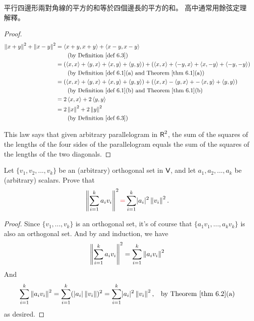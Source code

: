 \begin{note}
平行四邊形兩對角線的平方的和等於四個邊長的平方的和。
高中通常用餘弦定理解釋。
\end{note}

\begin{proof}
\begin{align*}
    \norm{x + y}^2 + \norm{x - y}^2
    & = \LG x + y, x + y \RG + \LG x - y, x - y \RG \\
    & \quad \quad \text{(by \DEF{6.3})} \\
    & = (\LG x, x \RG + \LG y, x \RG + \LG x, y \RG + \LG y, y \RG) + (\LG x, x \RG + \LG -y, x \RG + \LG x, -y \RG + \LG -y, -y \RG) \\
    & \quad \quad \text{(by \DEF{6.1}(a) and \THM{6.1}(a))} \\
    & = (\LG x, x \RG + \LG y, x \RG + \LG x, y \RG + \LG y, y \RG) + (\LG x, x \RG - \LG y, x \RG + -\LG x, y \RG + \LG y, y \RG) \\
    & \quad \quad \text{(by \DEF{6.1}(b) and \THM{6.1}(b)} \\
    & = 2 \LG x, x \RG + 2 \LG y, y \RG \\
    & = 2 \norm{x}^2 + 2 \norm{y}^2 \\
    & \quad \quad \text{(by \DEF{6.3})}
\end{align*}

This law says that given arbitrary parallelogram in \(\textsf{R}^2\), the sum of the squares of the lengths of the four sides of the parallelogram equals the sum of the squares of the lengths of the two diagonals.
\end{proof}

\begin{exercise} \label{exercise 6.1.12}
Let \(\{ v_1, v_2, ..., v_k \}\) be an (arbitrary) orthogonal set in \(\textsf{V}\), and let \(a_1, a_2, ..., a_k\) be (arbitrary) scalars.
Prove that
\[
    \norm{\sum_{i = 1}^k a_i v_i}^2 \RED{=} \sum_{i = 1}^k \abs{a_i}^2 \norm{v_i}^2.
\]
\end{exercise}

\begin{proof}
Since \(\{ v_1, ..., v_k \}\) is an orthogonal set, it's of course that \(\{ a_1 v_1, ..., a_k v_k \}\) is also an orthogonal set.
And by  and induction, we have
\[
    \left\lVert\sum_{i = 1}^k a_i v_i\right\rVert^2 = \sum_{i = 1}^k \left\lVert a_i v_i \right\rVert^2
\]
And
\begin{align*}
    \sum_{i = 1}^k \norm{ a_i v_i }^2 & = \sum_{i = 1}^k (\abs{a_i} \norm{v_i})^2
    = \sum_{i = 1}^k \abs{a_i}^2 \norm{v_i}^2, & \text{by \THM{6.2}(a)}
\end{align*}
as desired.
\end{proof}

